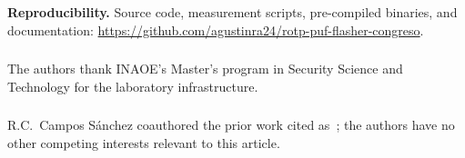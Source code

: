\documentclass[runningheads]{llncs}
\begin{document}
\medskip
\noindent\textbf{Reproducibility.}
Source code, measurement scripts, pre-compiled binaries, and documentation: \url{https://github.com/agustinra24/rotp-puf-flasher-congreso}.

\begin{credits}
\subsubsection{\ackname} The authors thank INAOE's Master's program in Security Science and Technology for the laboratory infrastructure.

\subsubsection{\discintname} R.C.~Campos S\'anchez coauthored the prior work cited as~\cite{salinas2026ejecucion}; the authors have no other competing interests relevant to this article.
\end{credits}



\end{document}
